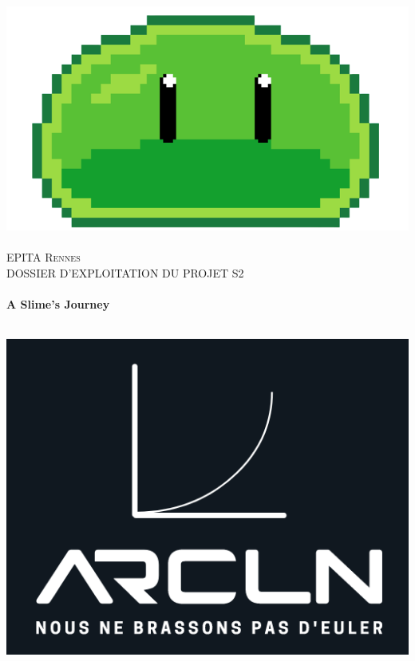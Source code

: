
\begin{titlepage}
    \begin{sffamily}
    \begin{center}
  
    
      \includegraphics[scale=0.3]{logo}~\\[1.5cm]
  
      \textsc{\LARGE EPITA Rennes}\\[0.5cm]
  
      \textsc{\Large DOSSIER D'EXPLOITATION DU PROJET S2}\\[1.5cm]
  
      \HRule \\[0.4cm]
       { \huge \bfseries  A Slime's Journey \\[0.4cm] }
  
      \HRule \\[2cm]
      \includegraphics[scale=0.4]{arcln}
       \\[0.5cm]
  

\end{center}
\end{sffamily}
\end{titlepage}
